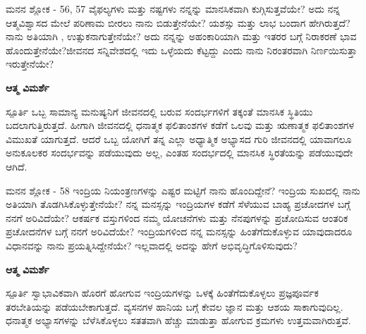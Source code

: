 \newpage
\begin{mananam}{\mananamfont ಮನನ ಶ್ಲೋಕ - \textenglish{56, 57}}
\footnotesize \mananamtext ವೈಫಲ್ಯಗಳು ಮತ್ತು ನಷ್ಟಗಳು ನನ್ನನ್ನು ಮಾನಸಿಕವಾಗಿ  ಕುಗ್ಗಿಸುತ್ತವೆಯೇ? ಅದು ನನ್ನ ಆತ್ಮವಿಶ್ವಾಸದ ಮೇಲೆ ಪರಿಣಾಮ ಬೀರಲು ನಾನು ಬಿಡುತ್ತೇನೆಯೇ? ಯಶಸ್ಸು ಮತ್ತು ಲಾಭ ಬಂದಾಗ ಹೇಗಿರುತ್ತದೆ? ನಾನು ಅತಿಯಾಗಿ , ಉತ್ಸುಕನಾಗುತ್ತೇನೆಯೇ? ಅದು ನನ್ನನ್ನು ಅಹಂಕಾರಿಯಾಗಿ ಮತ್ತು ಇತರರ ಬಗ್ಗೆ ನಿರಾಕರಣೆ ಭಾವ ಹೊಂದುತ್ತೇನೆಯೇ?ಜೀವನದ ಸನ್ನಿವೇಶದಲ್ಲಿ ಇದು ಒಳ್ಳೆಯದು ಕೆಟ್ಟದ್ದು ಎಂದು ನಾನು ನಿರಂತರವಾಗಿ ನಿರ್ಣಯಿಸುತ್ತಾ ಇರುತ್ತೇನೆಯೇ?
\end{mananam}
\WritingHand\enspace\textbf{ಆತ್ಮ ವಿಮರ್ಶೆ}
\begin{inspiration}{\mananamfont ಸ್ಪೂರ್ತಿ}
\footnotesize \mananamtext ಒಬ್ಬ ಸಾಮಾನ್ಯ ಮನುಷ್ಯನಿಗೆ ಜೀವನದಲ್ಲಿ ಬರುವ ಸಂದರ್ಭಗಳಿಗೆ ತಕ್ಕಂತೆ ಮಾನಸಿಕ ಸ್ಥಿತಿಯು ಬದಲಾಗುತ್ತಿರುತ್ತದೆ. ಹೀಗಾಗಿ ಜೀವನದಲ್ಲಿ ಧನಾತ್ಮಕ ಫಲಿತಾಂಶಗಳ ಕಡೆಗೆ ಒಲವು ಮತ್ತು ಋಣಾತ್ಮಕ ಫಲಿತಾಂಶಗಳ ವಿಮುಖತೆ ಯಾಗುತ್ತದೆ. ಆದರೆ ಒಬ್ಬ ಯೋಗಿಗೆ ತನ್ನ ಎಲ್ಲಾ ಅಧ್ಯಾತ್ಮಿಕ ಅಭ್ಯಾಸದ ಗುರಿ ಜೀವನದಲ್ಲಿ ಯಾವಾಗಲೂ ಅನುಕೂಲಕರ ಸಂದರ್ಭವನ್ನು ಪಡೆಯುವುದು ಅಲ್ಲ, ಎಂತಹ ಸಂದರ್ಭದಲ್ಲಿ ಮಾನಸಿಕ ಸ್ಥಿರತೆಯನ್ನು ಪಡೆಯುವುದೇ ಆಗಿದೆ.
\end{inspiration}
\newpage

\begin{mananam}{\mananamfont ಮನನ ಶ್ಲೋಕ - \textenglish{58}}
\footnotesize \mananamtext ಇಂದ್ರಿಯ ನಿಯಂತ್ರಣಗಳನ್ನು ಎಷ್ಟರ ಮಟ್ಟಿಗೆ ನಾನು ಹೊಂದಿದ್ದೇನೆ? ಇಂದ್ರಿಯ ಸುಖದಲ್ಲಿ ನಾನು ಅತಿಯಾಗಿ ತೊಡಗಿಸಿಕೊಳ್ಳುತ್ತೇನೆಯೇ? ನನ್ನ ಮನಸ್ಸನ್ನು ಇಂದ್ರಿಯಗಳ ಕಡೆಗೆ ಸೆಳೆಯುವ ಬಾಹ್ಯ ಪ್ರಚೋದಗಳ ಬಗ್ಗೆ ನನಗೆ ಅರಿವಿದೆಯೇ? ಆಕರ್ಷಕ ವಸ್ತುಗಳಿಂದ ನಮ್ಮ ಯೋಚನೆಗಳು ಮತ್ತು ನೆನಪುಗಳನ್ನು ಪ್ರಚೋದಿಸುವ ಆಂತರಿಕ ಪ್ರಚೋದನೆಗಳ ಬಗ್ಗೆ ನನಗೆ ಅರಿವಿದೆಯೇ? ಇಂದ್ರಿಯಗಳಿಂದ ನನ್ನ ಮನಸ್ಸನ್ನು ಹಿಂತೆಗೆದುಕೊಳ್ಳುವ ಯಾವುದಾದರೂ ವಿಧಾನವನ್ನು ನಾನು ಪ್ರಯತ್ನಿಸಿದ್ದೇನೆಯೇ? ಇಲ್ಲವಾದಲ್ಲಿ ಅದನ್ನು ಹೇಗೆ ಅಭಿವೃದ್ಧಿಗೊಳಿಸುವುದು?
\end{mananam}
\WritingHand\enspace\textbf{ಆತ್ಮ ವಿಮರ್ಶೆ}
\begin{inspiration}{\mananamfont ಸ್ಪೂರ್ತಿ}
\footnotesize \mananamtext ಸ್ವಾಭಾವಿಕವಾಗಿ ಹೊರಗೆ ಹೋಗುವ ಇಂದ್ರಿಯಗಳನ್ನು ಒಳಕ್ಕೆ ಹಿಂತೆಗೆದುಕೊಳ್ಳಲು ಪ್ರಜ್ಞಪೂರ್ವಕ ತರಬೇತಿಯನ್ನು ಪಡೆಯಬೇಕಾಗುತ್ತದೆ. ವ್ಯಸನಗಳ ಹಾನಿಯ ಬಗ್ಗೆ ಕೇವಲ ಜ್ಞಾನ ಮತ್ತು ಆಶಯ ಸಾಕಾಗುವುದಿಲ್ಲ. ಧನಾತ್ಮಕ ಅಭ್ಯಾಸಗಳನ್ನು ಬೆಳೆಸಿಕೊಳ್ಳಲು ಸತತವಾಗಿ ಹೆಚ್ಚು ಮಾಡುತ್ತಾ ಹೋಗುವ ಕ್ರಮಗಳು ಉತ್ತಮವಾಗಿರುತ್ತವೆ.
\end{inspiration}
\newpage

